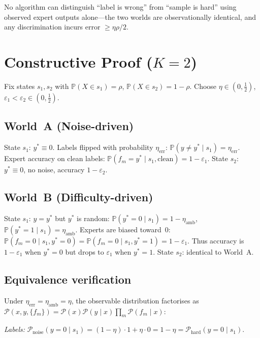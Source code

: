 \documentclass[10pt,a4paper]{article}
\theoremstyle{definition}
\theoremstyle{remark}
\begin{document}
No algorithm can distinguish ``label is wrong'' from ``sample is hard'' using observed
expert outputs alone---the two worlds are observationally identical, and any discrimination
incurs error $\ge\eta\rho/2$.

\section{Constructive Proof ($K=2$)}

Fix states $s_1,s_2$ with $\mathbb{P}(X\!\in\!s_1)=\rho$, $\mathbb{P}(X\!\in\!s_2)=1-\rho$.
Choose $\eta\!\in\!(0,\tfrac12)$, $\varepsilon_1\!<\!\varepsilon_2\!\in\!(0,\tfrac12)$.

\subsection*{World~A (Noise-driven)}

State $s_1$: $y^*\equiv0$.  Labels flipped with probability $\eta_{\text{err}}$:
$\mathbb{P}(y\!\neq\!y^*\mid s_1)=\eta_{\text{err}}$.
Expert accuracy on clean labels: $\mathbb{P}(f_m=y^*\mid s_1,\text{clean})=1-\varepsilon_1$.
State $s_2$: $y^*\equiv0$, no noise, accuracy $1-\varepsilon_2$.

\subsection*{World~B (Difficulty-driven)}

State $s_1$: $y=y^*$ but $y^*$ is random:
$\mathbb{P}(y^*=0\mid s_1)=1-\eta_{\text{amb}}$,
$\mathbb{P}(y^*=1\mid s_1)=\eta_{\text{amb}}$.
Experts are biased toward~0: $\mathbb{P}(f_m=0\mid s_1,y^*=0)=\mathbb{P}(f_m=0\mid s_1,y^*=1)=1-\varepsilon_1$.
Thus accuracy is $1-\varepsilon_1$ when $y^*=0$ but drops to $\varepsilon_1$ when $y^*=1$.
State $s_2$: identical to World~A.

\subsection*{Equivalence verification}

Under $\eta_{\text{err}}=\eta_{\text{amb}}=\eta$, the observable distribution factorises as
$\mathcal{P}(x,y,\{f_m\})=\mathcal{P}(x)\mathcal{P}(y\mid x)\prod_m\mathcal{P}(f_m\mid x)$:

\smallskip
\textit{Labels:}
$\mathcal{P}_{\text{noise}}(y=0\mid s_1)=(1-\eta)\cdot1+\eta\cdot0=1-\eta
 =\mathcal{P}_{\text{hard}}(y=0\mid s_1)$.
\end{document}
